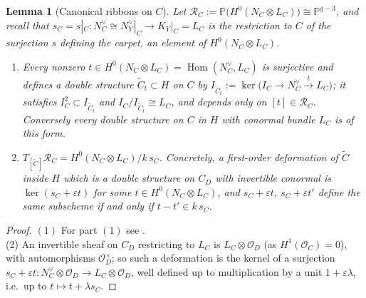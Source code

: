\documentclass[11pt,reqno]{amsart}
\theoremstyle{plain}
\newtheorem{lemma}[theorem]{Lemma}
\theoremstyle{definition}
\newcommand{\PP}{\mathbb{P}}
\newcommand{\OO}{\mathcal{O}}
\newcommand{\Hom}{\operatorname{Hom}}
\newcommand{\Yt}{\widetilde{Y}}
\newcommand{\Ct}{\widetilde{C}}
\newcommand{\RC}{\mathcal{R}_C}
\newcommand{\Dd}{D}
\begin{document}
\begin{lemma}[Canonical ribbons on $C$]\label{lem:RC}
Let $\RC:=\PP\big(H^0(N_C\otimes L_C)\big)\cong\PP^{g-3}$, and recall that $s_C=s|_C\colon N_C^{\vee}\cong N_Y^{\vee}|_C\to K_Y|_C=L_C$ is the restriction to $C$ of the surjection $s$ defining the carpet, an element of $H^0(N_C\otimes L_C)$.
\begin{enumerate}
\item Every nonzero $t\in H^0(N_C\otimes L_C)=\Hom(N_C^{\vee},L_C)$ is surjective and defines a double structure $\Ct_t\subset H$ on $C$ by $I_{\Ct_t}:=\ker\big(I_C\to N_C^{\vee}\xrightarrow{t}L_C\big)$; it satisfies $I_C^2\subset I_{\Ct_t}$ and $I_C/I_{\Ct_t}\cong L_C$, and depends only on $[t]\in\RC$. Conversely every double structure on $C$ in $H$ with conormal bundle $L_C$ is of this form. 
\item $T_{[\Ct]}\RC=H^0(N_C\otimes L_C)/k\,s_C$. Concretely, a first-order deformation of $\Ct$ inside $H$ which is a double structure on $C_\Dd$ with invertible conormal is $\ker(s_C+\varepsilon t)$ for some $t\in H^0(N_C\otimes L_C)$, and $s_C+\varepsilon t$, $s_C+\varepsilon t'$ define the same subscheme if and only if $t-t'\in k\,s_C$.
\end{enumerate}
\end{lemma}

\begin{proof}
$(1)$ For part $(1)$ see \cite[\S1]{BE95}. \\
(2) An invertible sheaf on $C_\Dd$ restricting to $L_C$ is $L_C\otimes\OO_\Dd$ (as $H^1(\OO_C)=0$), with automorphisms $\OO_\Dd^{\times}$; so such a deformation is the kernel of a surjection $s_C+\varepsilon t\colon N_C^{\vee}\otimes\OO_\Dd\to L_C\otimes\OO_\Dd$, well defined up to multiplication by a unit $1+\varepsilon\lambda$, i.e.\ up to $t\mapsto t+\lambda s_C$.
\end{proof}
\end{document}
